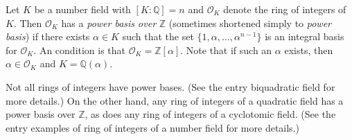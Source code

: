 \documentclass[12pt]{article}
\begin{document}
Let $K$ be a number field with $[K\!:\!\mathbb{Q}]=n$ and $\mathcal{O}_K$ denote the ring of integers of $K$.  Then $\mathcal{O}_K$ has a {\sl power basis over\/} $\mathbb{Z}$ (sometimes shortened simply to {\sl power basis\/}) if there exists $\alpha \in K$ such that the set $\{ 1, \alpha, \ldots, \alpha^{n-1}\}$ is an integral basis for $\mathcal{O}_K$.  An  condition is that $\mathcal{O}_K=\mathbb{Z}[\alpha]$.  Note that if such an $\alpha$ exists, then $\alpha \in \mathcal{O}_K$ and $K=\mathbb{Q}(\alpha)$.

Not all rings of integers have power bases.  (See the entry biquadratic field for more details.)  On the other hand, any ring of integers of a quadratic field has a power basis over $\mathbb{Z}$, as does any ring of integers of a cyclotomic field.  (See the entry examples of ring of integers of a number field for more details.)
\end{document}

